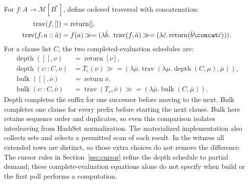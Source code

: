 For $f:A\to\mathcal M[B^*]$, define ordered traversal with concatenation:
\[
\begin{aligned}
 \operatorname{trav}(f,[]) &=\operatorname{return}[],\\
 \operatorname{trav}(f,a::\bar a)
  &= f(a)\mathbin{\gg=}(\lambda\bar b.\
       \operatorname{trav}(f,\bar a)\mathbin{\gg=}
       (\lambda\bar c.\operatorname{return}(\bar b\concat\bar c))).
\end{aligned}
\]
For a clause list $C$, the two completed-evaluation schedules are:
\[
\begin{aligned}
 \operatorname{depth}([],\nu)&=\operatorname{return}[\nu],\\
 \operatorname{depth}(c::C,\nu)
  &=T_c(\nu)\mathbin{\gg=}
       (\lambda\bar\mu.\operatorname{trav}
           (\lambda\mu.\operatorname{depth}(C,\mu),\bar\mu)),\\[2pt]
 \operatorname{bulk}([],\bar\nu)&=\operatorname{return}\bar\nu,\\
 \operatorname{bulk}(c::C,\bar\nu)
  &=\operatorname{trav}(T_c,\bar\nu)\mathbin{\gg=}
       (\lambda\bar\mu.\operatorname{bulk}(C,\bar\mu)).
\end{aligned}
\]
Depth completes the suffix for one successor before moving to the next. Bulk
completes one clause for every prefix before starting the next clause. Bulk
here retains sequence order and duplicates, so even this comparison isolates
interleaving from HashSet normalization. The materialized implementation also
collects sets and selects a permitted scan of each result. In the witness all
extended rows are distinct, so those extra choices do not remove the difference.
The cursor rules in Section~\ref{sec:cursor} refine the depth schedule to partial
demand; these complete-evaluation equations alone do not specify when build or
the first poll performs a computation.

